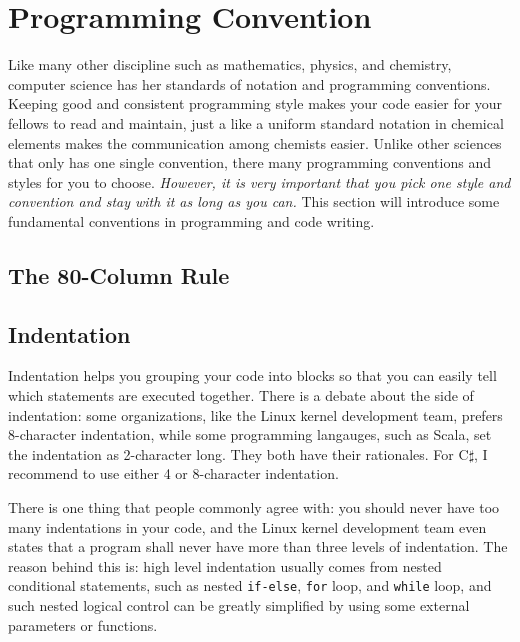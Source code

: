 \documentclass[../main.tex]{subfiles}
\begin{document}
\section{Programming Convention}
Like many other discipline such as mathematics, physics, and chemistry, computer
science has her standards of notation and programming conventions. Keeping good
and consistent programming style makes your code easier for your fellows to read
and maintain, just a like a uniform standard notation in chemical elements makes
the communication among chemists easier. Unlike other sciences that only has one
single convention, there many programming conventions and styles for you to
choose. \emph{However, it is very important that you pick one style and
convention and stay with it as long as you can.} This section will introduce
some fundamental conventions in programming and code writing.

\subsection {The 80-Column Rule}
\subsection {Indentation}
Indentation helps you grouping your code into blocks so that you can easily tell
which statements are executed together. There is a debate about the side of
indentation: some organizations, like the Linux kernel development team, prefers
8-character indentation, while some programming langauges, such as Scala, set
the indentation as 2-character long. They both have their rationales. For
C$\sharp$, I recommend to use either 4 or 8-character indentation.

There is one thing that people commonly agree with: you should never have too
many indentations in your code, and the Linux kernel development team even states
that a program shall never have more than three levels of indentation. The reason
behind this is: high level indentation usually comes from nested conditional
statements, such as nested \texttt{if-else}, \texttt{for} loop, and
\texttt{while} loop, and such nested logical control can be greatly simplified
by using some external parameters or functions. 
\end{document}
